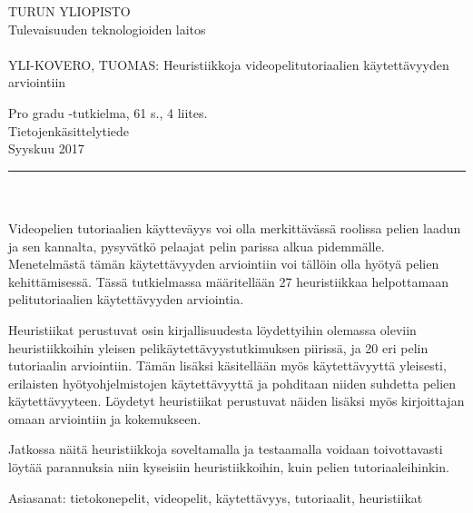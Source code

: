\documentclass[12pt, a4paper]{report}
\begin{document}
\begin{minipage}{15cm}
	\noindent
	TURUN YLIOPISTO\\
	Tulevaisuuden teknologioiden laitos\\
	\\
	YLI-KOVERO, TUOMAS: Heuristiikkoja videopelitutoriaalien käytettävyyden arviointiin
	
	Pro gradu -tutkielma, 61 s., 4 liites.\\
	Tietojenkäsittelytiede\\	
	Syyskuu 2017\\
	\rule{\textwidth}{.2mm}\\
	\\
	Videopelien tutoriaalien käytteväyys voi olla merkittävässä roolissa pelien laadun ja sen kannalta, pysyvätkö pelaajat pelin parissa alkua pidemmälle. Menetelmästä tämän käytettävyyden arviointiin voi tällöin olla hyötyä pelien kehittämisessä. Tässä tutkielmassa määritellään 27 heuristiikkaa helpottamaan pelitutoriaalien käytettävyyden arviointia. 
	
	\vspace{4mm}\noindent Heuristiikat perustuvat osin kirjallisuudesta löydettyihin olemassa oleviin heuris\-tiikkoihin yleisen pelikäytettävyystutkimuksen piirissä, ja 20 eri pelin tutoriaalin arviointiin. Tämän lisäksi käsitellään myös käytettävyyttä yleisesti, erilaisten hyötyohjelmistojen käytettävyyttä ja pohditaan niiden suhdetta pelien käytettävyyteen. Löydetyt heuristiikat perustuvat näiden lisäksi myös kirjoittajan omaan arviointiin ja kokemukseen.
	
	\vspace{4mm}\noindent Jatkossa näitä heuristiikkoja soveltamalla ja testaamalla voidaan toivottavasti löytää parannuksia niin kyseisiin heuristiikkoihin, kuin pelien tutoriaaleihinkin.
	
	\vspace{4mm}\noindent Asiasanat: tietokonepelit, videopelit, käytettävyys, tutoriaalit, heuristiikat
	
\end{minipage}
\cleardoublepage
{}
\tableofcontents
\cleardoublepage
{}
\pagestyle{plain} 
\setcounter{page}{1}











\end{document}
